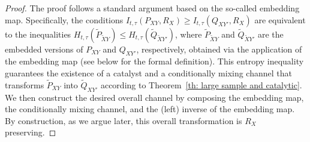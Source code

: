 \documentclass[aps,pra,11pt,onecolumn,nofootinbib,tightenlines]{revtex4-2}
\theoremstyle{definition}
\begin{document}
\begin{proof}
   The proof follows a standard argument based on the so-called embedding map. Specifically, the conditions $I_{t,\tau}(P_{XY},R_X) \geq I_{t,\tau}(Q_{XY'},R_X)$ are equivalent to the inequalities $H_{t,\tau}(\widetilde{P}_{\widetilde{X}Y}) \leq H_{t,\tau}(\widetilde{Q}_{\widetilde{X}Y'})$, where $\widetilde{P}_{\widetilde{X}Y}$ and $\widetilde{Q}_{\widetilde{X}Y'}$ are the embedded versions of $P_{XY}$ and $Q_{XY'}$, respectively, obtained via the application of the embedding map (see below for the formal definition).
   This entropy inequality guarantees the existence of a catalyst and a conditionally mixing channel 
   that transforms $\widetilde{P}_{XY}$ into $\widetilde{Q}_{XY'}$ according to Theorem~\ref{th: large sample and catalytic}. We then construct the desired overall channel by composing the embedding map, the conditionally mixing channel, and the (left) inverse of the embedding map. By construction, as we argue later, this overall transformation is $R_X$ preserving.

\bigskip


\end{proof}
\end{document}
